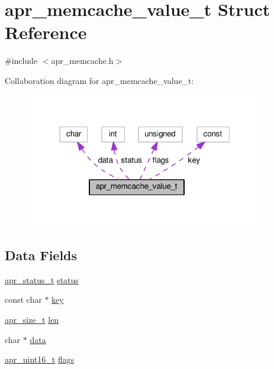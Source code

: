 \hypertarget{structapr__memcache__value__t}{}\section{apr\+\_\+memcache\+\_\+value\+\_\+t Struct Reference}
\label{structapr__memcache__value__t}


{\ttfamily \#include $<$apr\+\_\+memcache.\+h$>$}



Collaboration diagram for apr\+\_\+memcache\+\_\+value\+\_\+t\+:
\nopagebreak
\begin{figure}[H]
\begin{center}
\leavevmode
\includegraphics[width=295pt]{structapr__memcache__value__t__coll__graph}
\end{center}
\end{figure}
\subsection*{Data Fields}
\begin{DoxyCompactItemize}
\item 
\hyperlink{group__apr__errno_gaa5105fa83cc322f09382292db8b47593}{apr\+\_\+status\+\_\+t} \hyperlink{structapr__memcache__value__t_a02cb1c2f8e2ac25cd1ecfcb897f13b19}{status}
\item 
const char $\ast$ \hyperlink{structapr__memcache__value__t_a0f824723507e179cfa18a169d6efe4e4}{key}
\item 
\hyperlink{group__apr__platform_gaaa72b2253f6f3032cefea5712a27540e}{apr\+\_\+size\+\_\+t} \hyperlink{structapr__memcache__value__t_a64229f861b27fc4a9bdfab7b44c971a1}{len}
\item 
char $\ast$ \hyperlink{structapr__memcache__value__t_aaa222208c2c3f010f90043802afe235d}{data}
\item 
\hyperlink{group__apr__platform_ga3fb87c977e28a526d872d1081411b129}{apr\+\_\+uint16\+\_\+t} \hyperlink{structapr__memcache__value__t_a3314f50ec7a91e19abc44f15fdf2366f}{flags}
\end{DoxyCompactItemize}


